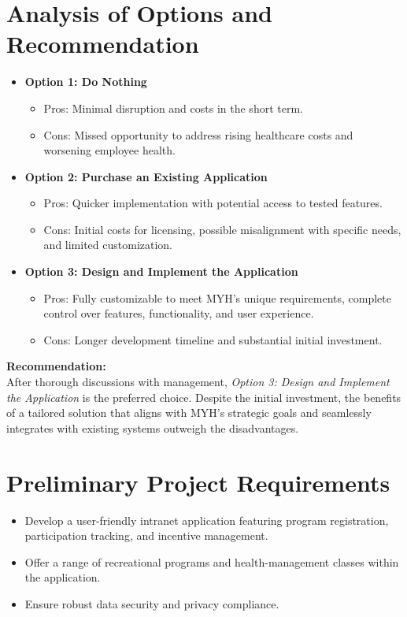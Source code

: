 \documentclass{article}
\begin{document}
\section*{Analysis of Options and Recommendation}
\begin{itemize}
    \item \textbf{Option 1: Do Nothing}
    \begin{itemize}
        \item Pros: Minimal disruption and costs in the short term.
        \item Cons: Missed opportunity to address rising healthcare costs and worsening employee health.
    \end{itemize}
    \item \textbf{Option 2: Purchase an Existing Application}
    \begin{itemize}
        \item Pros: Quicker implementation with potential access to tested features.
        \item Cons: Initial costs for licensing, possible misalignment with specific needs, and limited customization.
    \end{itemize}
    \item \textbf{Option 3: Design and Implement the Application}
    \begin{itemize}
        \item Pros: Fully customizable to meet MYH's unique requirements, complete control over features, functionality, and user experience.
        \item Cons: Longer development timeline and substantial initial investment.
    \end{itemize}
\end{itemize}

\textbf{Recommendation:}\\
After thorough discussions with management, \textit{Option 3: Design and Implement the Application} is the preferred choice. Despite the initial investment, the benefits of a tailored solution that aligns with MYH's strategic goals and seamlessly integrates with existing systems outweigh the disadvantages.

\section*{Preliminary Project Requirements}
\begin{itemize}
    \item Develop a user-friendly intranet application featuring program registration, participation tracking, and incentive management.
    \item Offer a range of recreational programs and health-management classes within the application.
    \item Ensure robust data security and privacy compliance.
\end{itemize}
\end{document}
